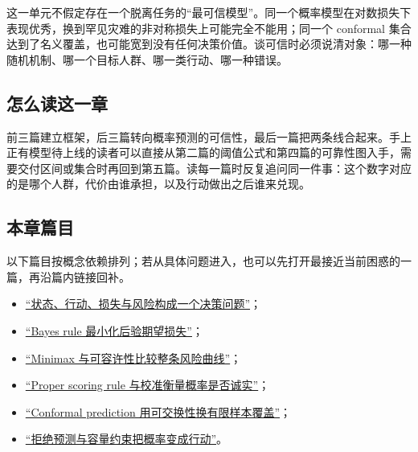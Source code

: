这一单元不假定存在一个脱离任务的``最可信模型''。同一个概率模型在对数损失下表现优秀，换到罕见灾难的非对称损失上可能完全不能用；同一个 conformal 集合达到了名义覆盖，也可能宽到没有任何决策价值。谈可信时必须说清对象：哪一种随机机制、哪一个目标人群、哪一类行动、哪一种错误。

\subsection{怎么读这一章}

前三篇建立框架，后三篇转向概率预测的可信性，最后一篇把两条线合起来。手上正有模型待上线的读者可以直接从第二篇的阈值公式和第四篇的可靠性图入手，需要交付区间或集合时再回到第五篇。读每一篇时反复追问同一件事：这个数字对应的是哪个人群，代价由谁承担，以及行动做出之后谁来兑现。

\subsection{本章篇目}

以下篇目按概念依赖排列；若从具体问题进入，也可以先打开最接近当前困惑的一篇，再沿篇内链接回补。

\begin{itemize}
\tightlist
\item \hyperref[sec:11-Mathematical-Statistics/07-Statistical-Decision-and-Reliable-Prediction/01]{``状态、行动、损失与风险构成一个决策问题''}；
\item \hyperref[sec:11-Mathematical-Statistics/07-Statistical-Decision-and-Reliable-Prediction/02]{``Bayes rule 最小化后验期望损失''}；
\item \hyperref[sec:11-Mathematical-Statistics/07-Statistical-Decision-and-Reliable-Prediction/03]{``Minimax 与可容许性比较整条风险曲线''}；
\item \hyperref[sec:11-Mathematical-Statistics/07-Statistical-Decision-and-Reliable-Prediction/04]{``Proper scoring rule 与校准衡量概率是否诚实''}；
\item \hyperref[sec:11-Mathematical-Statistics/07-Statistical-Decision-and-Reliable-Prediction/05]{``Conformal prediction 用可交换性换有限样本覆盖''}；
\item \hyperref[sec:11-Mathematical-Statistics/07-Statistical-Decision-and-Reliable-Prediction/06]{``拒绝预测与容量约束把概率变成行动''}。
\end{itemize}
